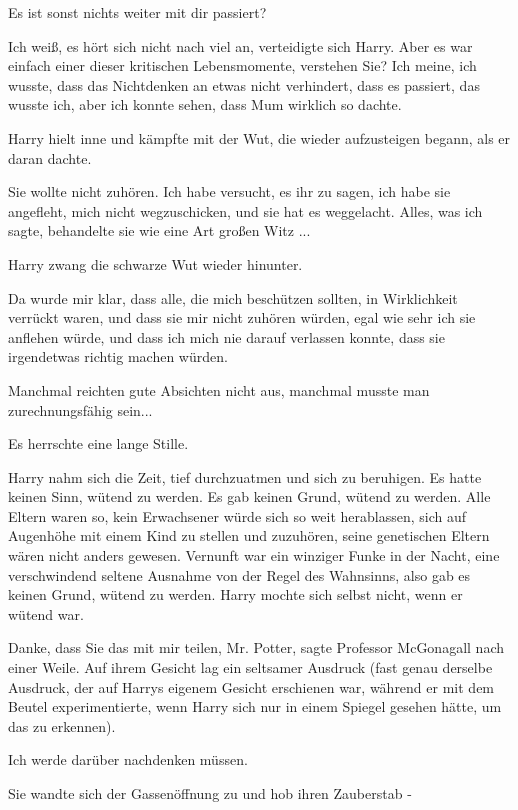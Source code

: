 \glqq Es ist sonst nichts weiter mit dir passiert?\grqq{}

\glqq Ich weiß, es hört sich nicht nach viel an\grqq{}, verteidigte sich Harry.
\glqq Aber es war einfach einer dieser kritischen Lebensmomente, verstehen Sie?
Ich meine, ich wusste, dass das Nichtdenken an etwas nicht verhindert, dass es
passiert, das wusste ich, aber ich konnte sehen, dass Mum wirklich so
dachte.\grqq{}

Harry hielt inne und kämpfte mit der Wut, die wieder aufzusteigen begann, als er
daran dachte.

\glqq Sie wollte nicht zuhören. Ich habe versucht, es ihr zu sagen, ich habe sie
angefleht, mich nicht wegzuschicken, und sie hat es weggelacht. Alles, was ich
sagte, behandelte sie wie eine Art großen Witz ...\grqq{}

Harry zwang die schwarze Wut wieder hinunter.

\glqq Da wurde mir klar, dass alle, die mich beschützen sollten, in Wirklichkeit
verrückt waren, und dass sie mir nicht zuhören würden, egal wie sehr ich sie
anflehen würde, und dass ich mich nie darauf verlassen konnte, dass sie
irgendetwas richtig machen würden.\grqq{}

Manchmal reichten gute Absichten nicht aus, manchmal musste man zurechnungsfähig
sein...

Es herrschte eine lange Stille.

Harry nahm sich die Zeit, tief durchzuatmen und sich zu beruhigen. Es hatte
keinen Sinn, wütend zu werden. Es gab keinen Grund, wütend zu werden. Alle
Eltern waren so, kein Erwachsener würde sich so weit herablassen, sich auf
Augenhöhe mit einem Kind zu stellen und zuzuhören, seine genetischen Eltern
wären nicht anders gewesen. Vernunft war ein winziger Funke in der Nacht, eine
verschwindend seltene Ausnahme von der Regel des Wahnsinns, also gab es keinen
Grund, wütend zu werden. Harry mochte sich selbst nicht, wenn er wütend war.

\glqq Danke, dass Sie das mit mir teilen, Mr. Potter\grqq{}, sagte Professor
McGonagall nach einer Weile. Auf ihrem Gesicht lag ein seltsamer Ausdruck (fast
genau derselbe Ausdruck, der auf Harrys eigenem Gesicht erschienen war, während
er mit dem Beutel experimentierte, wenn Harry sich nur in einem Spiegel gesehen
hätte, um das zu erkennen).

\glqq Ich werde darüber nachdenken müssen.\grqq{}

Sie wandte sich der Gassenöffnung zu und hob ihren Zauberstab -

